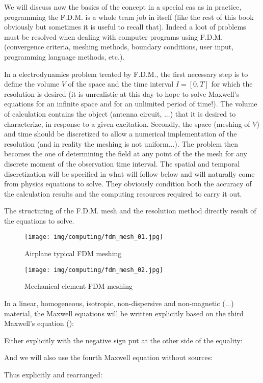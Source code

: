 	We will discuss now the basics of the concept in a special cas as in practice, programming the F.D.M. is a whole team job in itself (like the rest of this book obviously but sometimes it is useful to recall that). Indeed a loot of problems must be resolved when dealing with computer programs using F.D.M. (convergence criteria, meshing methods, boundary conditions, user input, programming language methods, etc.).

	In a electrodynamics problem treated by F.D.M., the first necessary step is to define the volume $V$ of the space and the time interval $I = [0, T]$ for which the resolution is desired (it is unrealistic at this day to hope to solve Maxwell's equations for an infinite space and for an unlimited period of time!). The volume of calculation contains the object (antenna circuit, ...) that it is desired to characterize, in response to a given excitation. Secondly, the space (meshing of $V$) and time should be discretized to allow a numerical implementation of the resolution (and in reality the meshing is not uniform...). The problem then becomes the one of determining the field at any point of the the mesh for any discrete moment of the observation time interval. The spatial and temporal discretization will be specified in what will follow below and will naturally come from physics equations to solve. They obviously condition both the accuracy of the calculation results and the computing resources required to carry it out.

	The structuring of the F.D.M. mesh and the resolution method directly result of the equations to solve.
	\begin{figure}[H]
		\centering
		\texttt{[image: img/computing/fdm\_mesh\_01.jpg]}
		\caption{Airplane typical FDM meshing}
	\end{figure}
	\begin{figure}[H]
		\centering
		\texttt{[image: img/computing/fdm\_mesh\_02.jpg]}
		\caption{Mechanical element FDM meshing}
	\end{figure}
	In a linear, homogeneous, isotropic, non-dispersive and non-magnetic (...) material, the Maxwell equations will be written explicitly based on the third Maxwell's equation ():
	
	Either explicitly with the negative sign put at the other side of the equality:
	
	And we will also use the fourth Maxwell equation without sources:
	
	Thus explicitly and rearranged:
	
